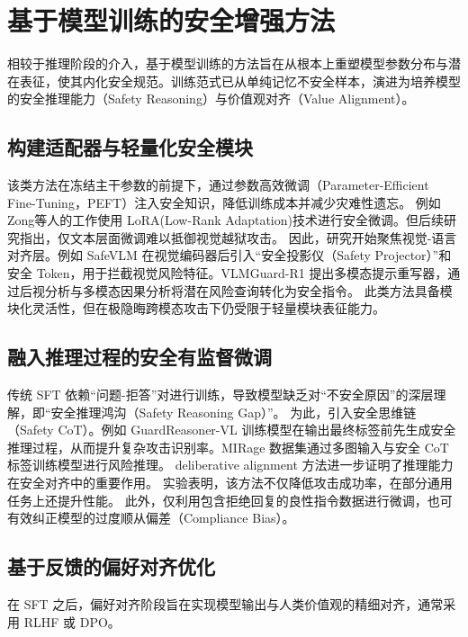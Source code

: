 \section{基于模型训练的安全增强方法}
相较于推理阶段的介入，基于模型训练的方法旨在从根本上重塑模型参数分布与潜在表征，使其内化安全规范。训练范式已从单纯记忆不安全样本，演进为培养模型的安全推理能力（Safety Reasoning）与价值观对齐（Value Alignment）。
\subsection{构建适配器与轻量化安全模块}

该类方法在冻结主干参数的前提下，通过参数高效微调（Parameter-Efficient Fine-Tuning，PEFT）注入安全知识，降低训练成本并减少灾难性遗忘。
例如Zong等人的工作\supercite{DBLP:conf/icml/ZongBYYH24}使用 LoRA(Low-Rank Adaptation)技术进行安全微调。但后续研究\supercite{DBLP:journals/corr/abs-2505-24208}指出，仅文本层面微调难以抵御视觉越狱攻击。
因此，研究开始聚焦视觉-语言对齐层。例如 SafeVLM 在视觉编码器后引入“安全投影仪（Safety Projector）”和安全 Token，用于拦截视觉风险特征。VLMGuard-R1 \supercite{Chen2025VLMGuardR1}提出多模态提示重写器，通过后视分析与多模态因果分析将潜在风险查询转化为安全指令\supercite{DBLP:conf/cvpr/ZhangCZGZFYJQ0Z25, DBLP:journals/corr/abs-2508-18649}。
此类方法具备模块化灵活性，但在极隐晦跨模态攻击下仍受限于轻量模块表征能力。

\subsection{融入推理过程的安全有监督微调}

传统 SFT 依赖“问题-拒答”对进行训练，导致模型缺乏对“不安全原因”的深层理解，即“安全推理鸿沟（Safety Reasoning Gap）”。
为此，引入安全思维链（Safety CoT）。例如 GuardReasoner-VL 训练模型在输出最终标签前先生成安全推理过程，从而提升复杂攻击识别率。MIRage 数据集通过多图输入与安全 CoT 标签训练模型进行风险推理\supercite{DBLP:journals/corr/abs-2505-18531}。 deliberative alignment 方法进一步证明了推理能力在安全对齐中的重要作用\supercite{guan-deliberative-alignment-2024}。
实验表明，该方法不仅降低攻击成功率，在部分通用任务上还提升性能。
此外，仅利用包含拒绝回复的良性指令数据进行微调，也可有效纠正模型的过度顺从偏差（Compliance Bias）。

\subsection{基于反馈的偏好对齐优化}

在 SFT 之后，偏好对齐阶段旨在实现模型输出与人类价值观的精细对齐，通常采用 RLHF 或 DPO。


